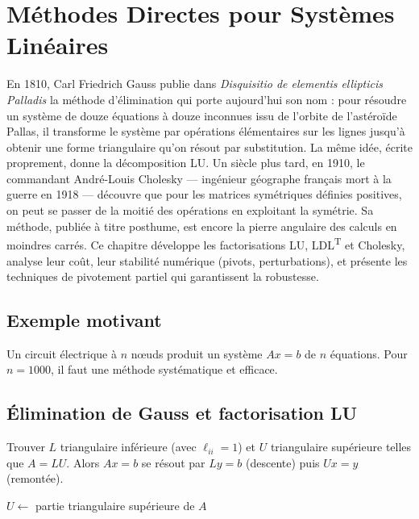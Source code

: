 \chapter{M\'ethodes Directes pour Syst\`emes Lin\'eaires}
\label{ch:directes}

En 1810, Carl Friedrich Gauss publie dans \emph{Disquisitio de elementis ellipticis Palladis} la méthode d'élimination qui porte aujourd'hui son nom : pour résoudre un système de douze équations à douze inconnues issu de l'orbite de l'astéroïde Pallas, il transforme le système par opérations élémentaires sur les lignes jusqu'à obtenir une forme triangulaire qu'on résout par substitution. La même idée, écrite proprement, donne la décomposition LU. Un siècle plus tard, en 1910, le commandant André-Louis Cholesky --- ingénieur géographe français mort à la guerre en 1918 --- découvre que pour les matrices symétriques définies positives, on peut se passer de la moitié des opérations en exploitant la symétrie. Sa méthode, publiée à titre posthume, est encore la pierre angulaire des calculs en moindres carrés. Ce chapitre développe les factorisations LU, LDL\textsuperscript{T} et Cholesky, analyse leur coût, leur stabilité numérique (pivots, perturbations), et présente les techniques de pivotement partiel qui garantissent la robustesse.

\section{Exemple motivant}
Un circuit \'electrique \`a $n$ n\oe uds produit un syst\`eme $Ax=b$ de $n$ \'equations. Pour $n=1000$, il faut une m\'ethode syst\'ematique et efficace.

\section{\'Elimination de Gauss et factorisation LU}

\begin{definition}[Factorisation LU]
Trouver $L$ triangulaire inf\'erieure (avec $\ell_{ii}=1$) et $U$ triangulaire sup\'erieure telles que $A=LU$. Alors $Ax=b$ se r\'esout par $Ly=b$ (descente) puis $Ux=y$ (remont\'ee).
\end{definition}

\begin{algorithm}[H]
\caption{Factorisation LU (sans pivot)}\label{alg:lu}
$U \gets$ partie triangulaire sup\'erieure de $A$\;
\end{algorithm}

